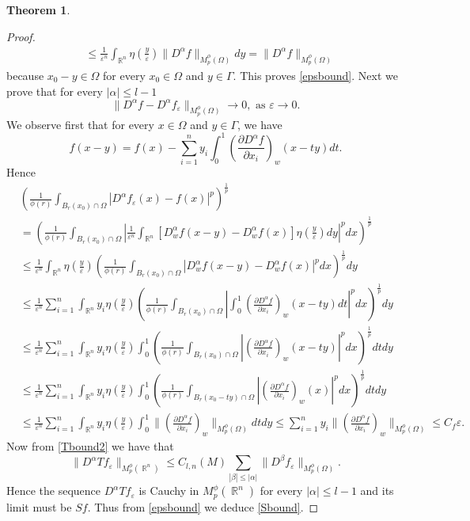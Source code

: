\documentclass[12pt]{article}
\theoremstyle{definition}
\newtheorem{theorem}{Theorem}
\DeclareMathOperator\rr{\mathbb{R}}
\begin{document}
\begin{theorem}
\begin{proof}
\begin{align*}
 & \le \frac{1}{\varepsilon^n}  \int_{\rr^n} \eta(\frac{y}{\varepsilon} ) \| D^\alpha f\|_{M_p^\phi(\Omega)} dy=\| D^\alpha f\|_{M_p^\phi(\Omega)}
\end{align*}
because $x_0-y \in \Omega$ for every $x_0 \in \Omega$ and $y \in \Gamma.$ This proves \eqref{epsbound}. Next we prove that for every $|\alpha|\le l-1$
\[ \|D^\alpha f -D^\alpha f_\varepsilon \|_{M^\phi_p(\Omega)} \to 0, \text{ as } \varepsilon \to 0.\]
We observe first that for every $x \in \Omega$ and $y \in \Gamma$, we have
\[ f(x-y)=f(x)-\sum_{i=1}^n y_i \int_0^1 \left(\frac{\partial D^\alpha f}{\partial x_i}\right)_w(x-ty)dt.\]
Hence
\begin{align*}
&\left( \frac{1}{	\phi(r)} \int_{B_r(x_0)\cap \Omega} |D^\alpha f_\varepsilon (x)-f(x)|^p \right)^{\frac{1}{p}} \\
&= \left( \frac{1}{	\phi(r)} \int_{B_r(x_0)\cap \Omega} \left |\frac{1}{\varepsilon^n} \int_{\rr^n} [D^\alpha_w f(x-y)-D^\alpha_wf(x)]\eta(\frac{y}{\varepsilon} )dy \right|^pdx \right)^{\frac{1}{p}} \\
&\le \frac{1}{\varepsilon^n}\int_{\rr^n}  \eta(\frac{y}{\varepsilon} )\left(  \frac{1}{	\phi(r)}  \int_{B_r(x_0)\cap \Omega}  \left |D^\alpha_w f(x-y)-D^\alpha_wf(x) \right|^pdx\right)^{\frac{1}{p}}dy  \\
&\le \frac{1}{\varepsilon^n}\sum_{i=1}^n\int_{\rr^n}  y_i \eta(\frac{y}{\varepsilon} )\left(  \frac{1}{	\phi(r)}  \int_{B_r(x_0)\cap \Omega}   \left| \int_0^1 \left(\frac{\partial D^\alpha f}{\partial x_i}\right)_w(x-ty)dt \right|^pdx\right)^{\frac{1}{p}}dy  \\
&\le \frac{1}{\varepsilon^n}\sum_{i=1}^n\int_{\rr^n}y_i  \eta(\frac{y}{\varepsilon} )   \int_0^1 \left(  \frac{1}{	\phi(r)}  \int_{B_r(x_0)\cap \Omega} \left| \left(\frac{\partial D^\alpha f}{\partial x_i}\right)_w(x-ty)\right|^pdx\right)^{\frac{1}{p}} dtdy  \\
&\le \frac{1}{\varepsilon^n}\sum_{i=1}^n\int_{\rr^n}  y_i \eta(\frac{y}{\varepsilon} )   \int_0^1 \left(  \frac{1}{	\phi(r)}  \int_{B_r(x_0-ty)\cap \Omega} \left| \left(\frac{\partial D^\alpha f}{\partial x_i}\right)_w(x)\right|^pdx\right)^{\frac{1}{p}} dtdy  \\
&\le \frac{1}{\varepsilon^n}\sum_{i=1}^n\int_{\rr^n}  y_i \eta(\frac{y}{\varepsilon} )   \int_0^1 \| \left(\frac{\partial D^\alpha f}{\partial x_i}\right)_w\|_{M_p^\phi(\Omega)}dtdy \le\sum_{i=1}^n  y_i \| \left(\frac{\partial D^\alpha f}{\partial x_i}\right)_w\|_{M_p^\phi(\Omega)}\le C_f \varepsilon.
\end{align*}
Now from \eqref{Tbound2} we have that
\[  \| D^\alpha Tf_\varepsilon\|_{M_p^\phi(\rr^n)}\le C_{l,n}(M)\sum_{|\beta|\le |\alpha|}\|D^\beta f_\varepsilon \|_{M_p^\phi(\Omega)} \label{Tbound}. \]
Hence the sequence $D^\alpha Tf_\varepsilon$ is Cauchy in $M_p^\phi(\rr^n)$ for every $|\alpha|\le l-1$ and its limit must be $Sf.$ Thus from \eqref{epsbound} we deduce \eqref{Sbound}.

 \end{proof} 
\end{theorem}





\end{document}

